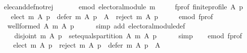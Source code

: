 \begin{isabellebody}
\isamarkupfalse%
%
\endisatagproof
{\isafoldproof}%
%
\isadelimproof
\isanewline
%
\endisadelimproof
\isanewline
{}\isamarkupfalse%
\ elec{\isacharunderscore}{\kern0pt}and{\isacharunderscore}{\kern0pt}def{\isacharunderscore}{\kern0pt}not{\isacharunderscore}{\kern0pt}rej{\isacharcolon}{\kern0pt}\isanewline
\ \ \isanewline
\ \ \ \ e{\isacharunderscore}{\kern0pt}mod{\isacharcolon}{\kern0pt}\ {\isachardoublequoteopen}electoral{\isacharunderscore}{\kern0pt}module\ m{\isachardoublequoteclose}\ \isanewline
\ \ \ \ f{\isacharunderscore}{\kern0pt}prof{\isacharcolon}{\kern0pt}\ {\isachardoublequoteopen}finite{\isacharunderscore}{\kern0pt}profile\ A\ p{\isachardoublequoteclose}\isanewline
\ \ \ {\isachardoublequoteopen}elect\ m\ A\ p\ {\isasymunion}\ defer\ m\ A\ p\ {\isacharequal}{\kern0pt}\ A\ {\isacharminus}{\kern0pt}\ {\isacharparenleft}{\kern0pt}reject\ m\ A\ p{\isacharparenright}{\kern0pt}{\isachardoublequoteclose}\isanewline
%
\isadelimproof
%
\endisadelimproof
%
\isatagproof
{}\isamarkupfalse%
\ {\isacharminus}{\kern0pt}\isanewline
\ \ \isamarkupfalse%
\ e{\isacharunderscore}{\kern0pt}mod\ f{\isacharunderscore}{\kern0pt}prof\ \isamarkupfalse%
\ {}{\isacharcolon}{\kern0pt}\ {\isachardoublequoteopen}well{\isacharunderscore}{\kern0pt}formed\ A\ {\isacharparenleft}{\kern0pt}m\ A\ p{\isacharparenright}{\kern0pt}{\isachardoublequoteclose}\isanewline
\ \ \ \ \isamarkupfalse%
\ {\isacharparenleft}{\kern0pt}simp\ add{\isacharcolon}{\kern0pt}\ electoral{\isacharunderscore}{\kern0pt}module{\isacharunderscore}{\kern0pt}def{\isacharparenright}{\kern0pt}\isanewline
\ \ \isamarkupfalse%
\isanewline
\ \ \ \ {\isachardoublequoteopen}disjoint{}\ {\isacharparenleft}{\kern0pt}m\ A\ p{\isacharparenright}{\kern0pt}\ {\isasymand}\ set{\isacharunderscore}{\kern0pt}equals{\isacharunderscore}{\kern0pt}partition\ A\ {\isacharparenleft}{\kern0pt}m\ A\ p{\isacharparenright}{\kern0pt}{\isachardoublequoteclose}\isanewline
\ \ \ \ \isamarkupfalse%
\ simp\isanewline
\ \ \isamarkupfalse%
\ e{\isacharunderscore}{\kern0pt}mod\ f{\isacharunderscore}{\kern0pt}prof\isanewline
\ \ \isamarkupfalse%
\ {\isachardoublequoteopen}{\isacharparenleft}{\kern0pt}elect\ m\ A\ p{\isacharparenright}{\kern0pt}\ {\isasymunion}\ {\isacharparenleft}{\kern0pt}reject\ m\ A\ p{\isacharparenright}{\kern0pt}\ {\isasymunion}\ {\isacharparenleft}{\kern0pt}defer\ m\ A\ p{\isacharparenright}{\kern0pt}\ {\isacharequal}{\kern0pt}\ A{\isachardoublequoteclose}\isanewline

\end{isabellebody}
